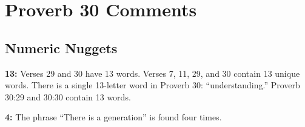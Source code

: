 \section{Proverb 30 Comments}

\subsection{Numeric Nuggets}
\textbf{13:} Verses 29 and 30 have 13 words. Verses 7, 11, 29, and 30 contain 13 unique words. There is a single 13-letter word in Proverb 30: ``understanding.'' Proverb 30:29 and  30:30 contain 13 words. 

\textbf{4:} The phrase ``There is a generation'' is found four times.

